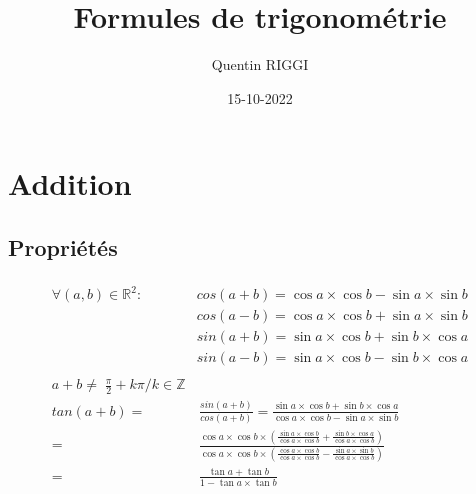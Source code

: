 \documentclass[a4paper]{article}
\title{\color{dark-red}\huge\textbf{Formules de trigonométrie}}
\date{15-10-2022}
\author{Quentin RIGGI}
\begin{document}
	\maketitle
	\section{Addition}
	\vspace{-1cm}
	\begin{center}
		\item \subsection*{Propriétés}
	
		\vspace{-0.4cm}

		\normalsize\begin{gather*}
			\begin{split}
				\forall (a, b)\in\mathbb{R}^2:\;&cos\left(a+b\right) = \cos{a}\times\cos{b} - \sin{a}\times\sin{b}\\
				&cos\left(a-b\right) = \cos{a}\times\cos{b} + \sin{a}\times\sin{b}\\
				&sin\left(a+b\right) = \sin{a}\times\cos{b} + \sin{b}\times\cos{a}\\
				&sin\left(a-b\right) = \sin{a}\times\cos{b} - \sin{b}\times\cos{a}\\
				\\
				a+b\neq\;\frac{\pi}{2}+k\pi/k\in\mathbb{Z}\\
				tan\left(a+b\right) =&\, \frac{sin\left(a+b\right)}{cos\left(a+b\right)} = \frac{\sin{a}\times\cos{b}+\sin{b}\times\cos{a}}{\cos{a}\times\cos{b}-\sin{a}\times\sin{b}}\\
				=&\, \frac{\cos{a}\times\cos{b}\times\left(\frac{\sin{a}\times\cos{b}}{\cos{a}\times\cos{b}}+\frac{\sin{b}\times\cos{a}}{\cos{a}\times\cos{b}}\right)}{\cos{a}\times\cos{b}\times\left(\frac{\cos{a}\times\cos{b}}{\cos{a}\times\cos{b}}-\frac{\sin{a}\times\sin{b}}{\cos{a}\times\cos{b}}\right)}\\
				=&\,\frac{\tan{a}+\tan{b}}{1-\tan{a}\times\tan{b}}\\
			\end{split}
		\end{gather*}

		\vspace{0.2cm}


\end{center}
\end{document}

